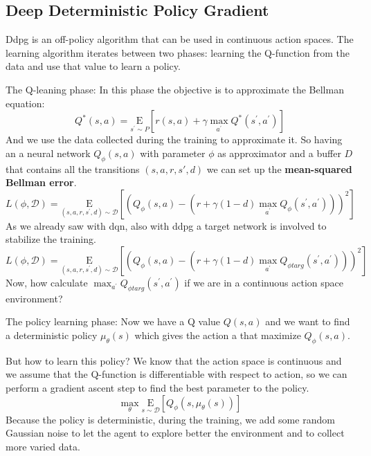 \subsection{Deep Deterministic Policy Gradient}
Ddpg is an off-policy algorithm that can be used in continuous action spaces.
The learning algorithm iterates between two phases: learning the Q-function from the data and use that value to learn a policy.

The Q-leaning phase:
In this phase the objective is to approximate the Bellman equation:
$$Q^{*}(s, a)=\underset{s^{\prime} \sim P}{\mathrm{E}}\left[r(s, a)+\gamma \max _{a^{\prime}} Q^{*}\left(s^{\prime}, a^{\prime}\right)\right]$$
And we use the data collected during the training to approximate it. 
So having an a neural network $Q_\phi (s,a) $  with parameter $\phi$ as approximator and a buffer $D$ that contains all the transitions $(s,a,r,s',d)$ we can set up the \textbf{mean-squared Bellman error}. 
$$L(\phi, \mathcal{D})=\underset{\left(s, a, r, s^{\prime}, d\right) \sim \mathcal{D}}{\mathrm{E}}\left[\left(Q_{\phi}(s, a)-\left(r+\gamma(1-d) \max _{a^{\prime}} Q_{\phi}\left(s^{\prime}, a^{\prime}\right)\right)\right)^{2}\right]$$
As we already saw with dqn, also with ddpg a target network is involved to stabilize the training.
$$L(\phi, \mathcal{D})=\underset{\left(s, a, r, s^{\prime}, d\right) \sim \mathcal{D}}{\mathrm{E}}\left[\left(Q_{\phi}(s, a)-\left(r+\gamma(1-d) \max _{a^{\prime}} Q_{\phi targ}\left(s^{\prime}, a^{\prime}\right)\right)\right)^{2}\right]$$
Now, how calculate $\max _{a^{\prime}} Q_{\phi targ}\left(s^{\prime}, a^{\prime}\right)$ if we are in a continuous action space environment?

The policy learning phase:
Now we have a Q value $Q(s,a)$ and we want to find a deterministic policy $\mu_{\theta}(s)$ which gives the action a that maximize $Q_\phi\left(s, a\right)$.

But how to learn this policy?
We know that the action space is continuous and we assume that the Q-function is differentiable with respect to action, so we can perform a gradient ascent step to find the best parameter to the policy.
$$\max _{\theta} \underset{s \sim \mathcal{D}}{\mathrm{E}}\left[Q_{\phi}\left(s, \mu_{\theta}(s)\right)\right]$$
Because the policy is deterministic, during the training, we add some random Gaussian noise to let the agent to explore better the environment and to collect more varied data.

